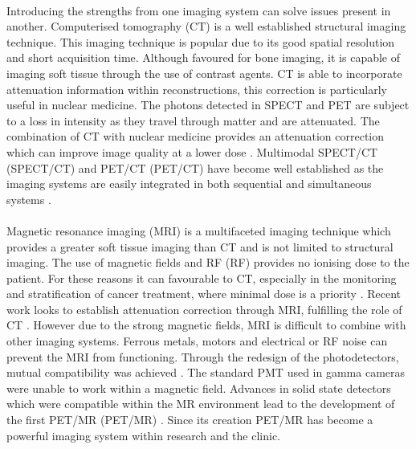 \paragraph{}
Introducing the strengths from one imaging system can solve issues present in another. Computerised tomography (\acrshort{CT}) is a well established structural imaging technique. This imaging technique is popular due to its good spatial resolution and short acquisition time. Although favoured for bone imaging, it is capable of imaging soft tissue through the use of contrast agents. \acrshort{CT} is able to incorporate attenuation information within reconstructions, this correction is particularly useful in nuclear medicine. The photons detected in \acrshort{SPECT} and \acrshort{PET} are subject to a loss in intensity as they travel through matter and are attenuated. The combination of \acrshort{CT} with nuclear medicine provides an attenuation correction which can improve image quality at a lower dose \cite{Blankespoor1996AttenuationAssessment}. Multimodal \acrlong{SPECT/CT} (\acrshort{SPECT/CT}) and \acrlong{PET/CT} (\acrshort{PET/CT}) have become well established as the imaging systems are easily integrated in both sequential and simultaneous systems \cite{Schillaci2005HybridImaging}.
\paragraph{}
Magnetic resonance imaging (\acrshort{MRI}) is a multifaceted imaging technique which provides a greater soft tissue imaging  than \acrshort{CT} and is not limited to structural imaging. The use of magnetic fields and \acrlong{RF} (\acrshort{RF}) provides no ionising dose to the patient. For these reasons it can favourable to \acrshort{CT}, especially in the monitoring and stratification of cancer treatment, where minimal dose is a priority \cite{Cherry2009MultimodalitySPECT/CT}. Recent work looks to establish attenuation correction through \acrshort{MRI}, fulfilling the role of \acrshort{CT} \cite{Zaidi2007IsImaging} \cite{Hofmann2008MRI-basedRegistration}. However due to the strong magnetic fields, \acrshort{MRI} is difficult to combine with other imaging systems. Ferrous metals, motors and electrical or \acrshort{RF} noise can prevent the \acrshort{MRI} from functioning. Through the redesign of the photodetectors, mutual compatibility was achieved \cite{PICHLER2008199} \cite{Herbert2004FirstPhotomultiplier}. The standard \acrshort{PMT} used in gamma cameras were unable to work within a magnetic field. Advances in solid state detectors which were compatible within the \acrshort{MR} environment lead to the development of the first \acrlong{PET/MR} (\acrshort{PET/MR}) \cite{0031-9155-56-23-014}. Since its creation \acrshort{PET/MR} has become a powerful imaging system within research and the clinic. 
